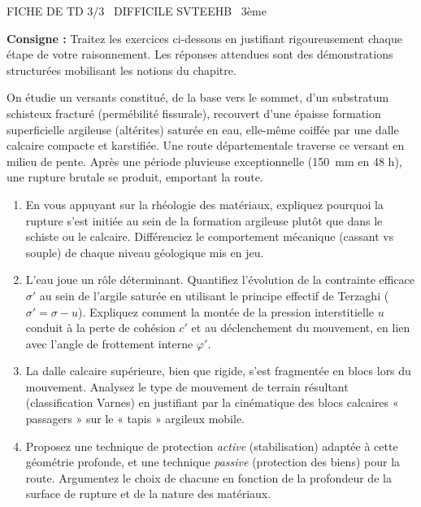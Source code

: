 \documentclass[11pt]{article}
\begin{document}
\begin{tcolorbox}[enhanced,colback=popink,colframe=popink,arc=10pt,boxrule=0pt,left=12pt,right=12pt,top=9pt,bottom=9pt]
{\color{white}\popxbold\small FICHE DE TD 3/3 \textbullet\ DIFFICILE \hfill SVTEEHB \textbullet\ 3ème\par}
\end{tcolorbox}
\vspace{4pt}
\noindent\textbf{Consigne :} Traitez les exercices ci-dessous en justifiant rigoureusement chaque étape de votre raisonnement. Les réponses attendues sont des démonstrations structurées mobilisant les notions du chapitre.

\begin{exercice}
On étudie un versants constitué, de la base vers le sommet, d'un substratum schisteux fracturé (permébilité fissurale), recouvert d'une épaisse formation superficielle argileuse (altérites) saturée en eau, elle-même coiffée par une dalle calcaire compacte et karstifiée. Une route départementale traverse ce versant en milieu de pente. Après une période pluvieuse exceptionnelle (\SI{150}{mm} en 48 h), une rupture brutale se produit, emportant la route.

\begin{enumerate}
    \item En vous appuyant sur la rhéologie des matériaux, expliquez pourquoi la rupture s'est initiée au sein de la formation argileuse plutôt que dans le schiste ou le calcaire. Différenciez le comportement mécanique (cassant vs souple) de chaque niveau géologique mis en jeu.
    \item L'eau joue un rôle déterminant. Quantifiez l'évolution de la contrainte efficace $\sigma'$ au sein de l'argile saturée en utilisant le principe effectif de Terzaghi ($\sigma' = \sigma - u$). Expliquez comment la montée de la pression interstitielle $u$ conduit à la perte de cohésion $c'$ et au déclenchement du mouvement, en lien avec l'angle de frottement interne $\varphi'$.
    \item La dalle calcaire supérieure, bien que rigide, s'est fragmentée en blocs lors du mouvement. Analysez le type de mouvement de terrain résultant (classification Varnes) en justifiant par la cinématique des blocs calcaires « passagers » sur le « tapis » argileux mobile.
    \item Proposez une technique de protection \textit{active} (stabilisation) adaptée à cette géométrie profonde, et une technique \textit{passive} (protection des biens) pour la route. Argumentez le choix de chacune en fonction de la profondeur de la surface de rupture et de la nature des matériaux.
\end{enumerate}
\end{exercice}
\end{document}
